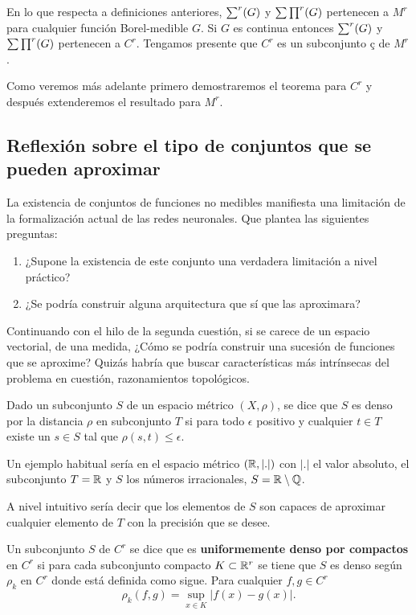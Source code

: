 En lo que respecta a definiciones anteriores, $\sum ^r (G)$ y $\sum \prod^r (G)$ pertenecen a 
$M^r$ para cualquier función Borel-medible $G$. Si $G$ es continua entonces 
$\sum ^r (G)$ y $\sum \prod^r (G)$ pertenecen a $C^r$. Tengamos presente que $C^r$ es un subconjunto ç
de $M^r$.  

Como veremos más adelante primero demostraremos el teorema para $C^r$ y después 
extenderemos el resultado para $M^r$.   


\subsection{ Reflexión sobre el tipo de conjuntos que se pueden aproximar}

La existencia de conjuntos de funciones no medibles manifiesta una limitación
de la formalización actual de las redes neuronales. Que plantea las siguientes 
preguntas: 
\begin{enumerate}
    \item ¿Supone la existencia de este conjunto una verdadera limitación a nivel práctico?
    \item ¿Se podría construir alguna arquitectura que sí que las aproximara?
\end{enumerate}  

Continuando con el hilo de la segunda cuestión, si se carece de un espacio vectorial, 
de una medida,  ¿Cómo se podría construir una sucesión de funciones que se aproxime?
Quizás habría que buscar características más intrínsecas del problema en cuestión, 
razonamientos topológicos.

\begin{definicion}  
    Dado un subconjunto $S$ de un espacio métrico $(X, \rho)$, se dice que $S$ es denso por la distancia $\rho$
    en subconjunto $T$ si para todo $\epsilon$ positivo y cualquier $t \in T$ existe un $s \in S$ tal 
    que $\rho(s,t) \leq \epsilon$. 
\end{definicion}

Un ejemplo habitual sería en el espacio métrico $(\mathbb{R}, |.|)$ con $|.|$ el valor absoluto, el subconjunto 
$T = \mathbb{R}$ y $S$ los números irracionales, $S = \mathbb{R} \setminus \mathbb{Q}$. 

A nivel intuitivo sería decir que los elementos de $S$ son capaces de aproximar cualquier elemento de $T$
con la precisión que se desee. 

\begin{definicion} 
    Un subconjunto $S$ de $C^r$ se dice que es \textbf{uniformemente denso por compactos} en  $C^r$
    si para cada subconjunto compacto $K \subset \mathbb{R}^r$ se tiene que $S$ es denso según $\rho_k$ en $C^r$
    donde está definida como sigue.
    Para cualquier $f,g \in C^r$ 
    \begin{equation}
        \rho _ k (f,g) = \sup_{x \in K} |f(x) - g(x)|.
    \end{equation}
\end{definicion}

